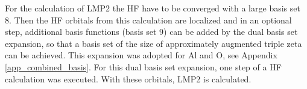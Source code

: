 \documentclass[11pt,DIV=13,BCOR=5mm,a4paper,headinclude]{scrbook}
\begin{document}
For the calculation of LMP2 the HF have to be converged with a large basis set 8.
Then the HF orbitals from this calculation are localized and in an optional step, additional basis functions (basis set 9) can be added by the dual basis set expansion\cite{Usvyat2010}, so that a basis set of the size of approximately augmented triple zeta can be achieved.
This expansion was adopted for Al and O, see Appendix \ref{app_combined_basis}.
For this dual basis set expansion, one step of a HF calculation was executed.
With these orbitals, LMP2 is calculated.
\end{document}
